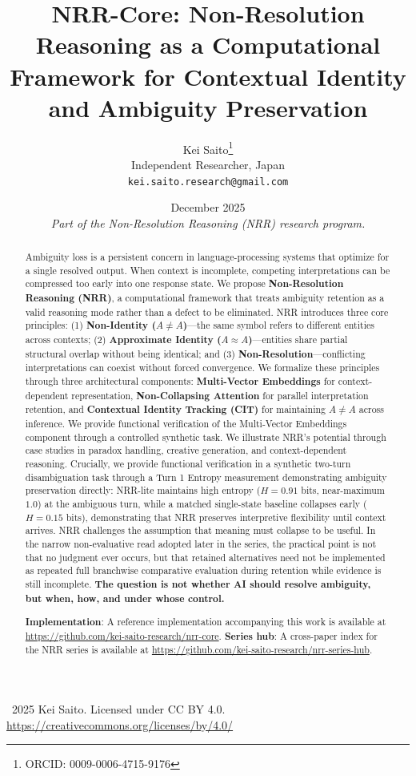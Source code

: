 \documentclass[11pt,a4paper]{article}
\title{\textbf{NRR-Core: Non-Resolution Reasoning as a Computational Framework for Contextual Identity and Ambiguity Preservation}}
\author{
  Kei Saito\thanks{ORCID: 0009-0006-4715-9176} \\
  Independent Researcher, Japan \\
  \texttt{kei.saito.research@gmail.com}
}
\date{December 2025 \\[0.5em]
\textit{Part of the Non-Resolution Reasoning (NRR) research program.}}
\begin{document}
\maketitle

\begin{center}
\textcopyright\ 2025 Kei Saito.
Licensed under CC BY 4.0.\\
\url{https://creativecommons.org/licenses/by/4.0/}
\end{center}

\begin{abstract}
Ambiguity loss is a persistent concern in language-processing systems that optimize for a single resolved output.
When context is incomplete, competing interpretations can be compressed too early into one response state.
We propose \textbf{Non-Resolution Reasoning (NRR)}, a computational framework that treats ambiguity retention as a valid reasoning mode rather than a defect to be eliminated.
NRR introduces three core principles: (1) \textbf{Non-Identity ($A \neq A$)}---the same symbol refers to different entities across contexts;
(2) \textbf{Approximate Identity ($A \approx A$)}---entities share partial structural overlap without being identical;
and (3) \textbf{Non-Resolution}---conflicting interpretations can coexist without forced convergence.
We formalize these principles through three architectural components: \textbf{Multi-Vector Embeddings} for context-dependent representation, \textbf{Non-Collapsing Attention} for parallel interpretation retention, and \textbf{Contextual Identity Tracking (CIT)} for maintaining $A \neq A$ across inference.
We provide functional verification of the Multi-Vector Embeddings component through a controlled synthetic task.
We illustrate NRR's potential through case studies in paradox handling, creative generation, and context-dependent reasoning.
Crucially, we provide functional verification in a synthetic two-turn disambiguation task through a Turn 1 Entropy measurement demonstrating ambiguity preservation directly: NRR-lite maintains high entropy ($H = 0.91$ bits, near-maximum $1.0$) at the ambiguous turn, while a matched single-state baseline collapses early ($H = 0.15$ bits), demonstrating that NRR preserves interpretive flexibility until context arrives.
NRR challenges the assumption that meaning must collapse to be useful. In the narrow non-evaluative read adopted later in the series, the practical point is not that no judgment ever occurs, but that retained alternatives need not be implemented as repeated full branchwise comparative evaluation during retention while evidence is still incomplete.
\textbf{The question is not whether AI should resolve ambiguity, but when, how, and under whose control.}

\textbf{Implementation}: A reference implementation accompanying this work 
is available at \url{https://github.com/kei-saito-research/nrr-core}.
\textbf{Series hub}: A cross-paper index for the NRR series is available at
\url{https://github.com/kei-saito-research/nrr-series-hub}.
\end{abstract}
\end{document}
